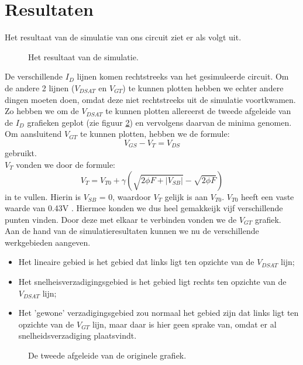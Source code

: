 \documentclass{scrartcl}  %
\begin{document}
\section{Resultaten}
Het resultaat van de simulatie van ons circuit ziet er als volgt uit.
\begin{figure}[H]
\centering
		\setlength{} 
		\setlength{}
		
		\caption{Het resultaat van de simulatie.}
		\label{fig:Id}
\end{figure}
De verschillende $I_{D}$ lijnen komen rechtstreeks van het gesimuleerde circuit. Om de andere 2 lijnen ($V_{DSAT}$ en $V_{GT}$) te kunnen plotten hebben we echter andere dingen moeten doen, omdat deze niet rechtstreeks uit de simulatie voortkwamen. Zo hebben we om de $V_{DSAT}$ te kunnen plotten allereerst de tweede afgeleide van de $I_{D}$ grafieken geplot (zie figuur \ref{fig:Id-2nd-div}) en vervolgens daarvan de minima genomen. \\
Om aansluitend $V_{GT}$ te kunnen plotten, hebben we de formule: 
\begin{equation}
V_{GS} - V_{T} = V_{DS} 
\end{equation} gebruikt.\\
$V_{T}$ vonden we door de formule: 
\begin{equation}
V_{T} = V_{T0} + \gamma (\sqrt {2 \phi F + |V_{SB}|} - \sqrt{ 2 \phi F} ) 
\end{equation} in te vullen. Hierin is $V_{SB}$ = 0, waardoor $V_{T}$  gelijk is aan $V_{T0}$. $V_{T0}$ heeft een vaste waarde van 0.43V \cite[103]{rabaey-integrated-circuits}. Hiermee konden we dus heel gemakkeijk vijf verschillende punten vinden. Door deze met elkaar te verbinden vonden we de $V_{GT}$ grafiek. \\
Aan de hand van de simulatieresultaten kunnen we nu de verschillende werkgebieden aangeven.
\begin{itemize}
	\item Het lineaire gebied is het gebied dat links ligt ten opzichte van de $V_{DSAT}$ lijn;
	\item Het snelheisverzadigingsgebied is het gebied ligt rechts ten opzichte van de $V_{DSAT}$ lijn;
	\item Het 'gewone' verzadigingsgebied zou normaal het gebied zijn dat links ligt ten opzichte van de $V_{GT}$ lijn, maar daar is hier geen sprake van, omdat er al snelheidsverzadiging plaatsvindt.
\end{itemize}

\begin{figure}[H]
\centering
		\setlength{} 
		\setlength{}
		
		\caption{De tweede afgeleide van de originele grafiek.}
		\label{fig:Id-2nd-div}
\end{figure}
\end{document}
